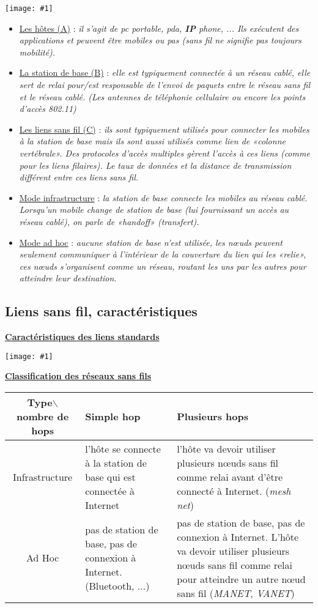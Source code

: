 \documentclass{article}
\newcommand{\ora}[1]{\textcolor{darko}{#1}}
\newcommand{\imgR}[2]{\begin{center}\texttt{[image: \#1]}\end{center}}
\newcommand{\point}[2]{\item \ora{\underline{#1}} : \textit{#2}}
\newcommand{\stitre}[1]{\noindent\textbf{\underline{#1}} \\}
\newcommand{\neuSP}{n\oe ud }
\newcommand{\neuSPs}{n\oe uds }
\begin{document}
\imgR{CN_142.png}{300}
\begin{itemize}
\point{Les hôtes (A)}{il s'agit de pc portable, pda, \textbf{IP} phone, ... Ils exécutent des applications et 
peuvent être mobiles ou pas (sans fil ne signifie pas toujours mobilité).}
\point{La station de base (B)}{elle est typiquement connectée à un réseau cablé, elle sert de relai pour/est 
responsable de l'envoi de paquets entre le réseau sans fil et le réseau cablé. (Les antennes de téléphonie 
cellulaire ou encore les points d'accès 802.11)}
\point{Les liens sans fil (C)}{ils sont typiquement utilisés pour connecter les mobiles à la station de base mais 
ils sont aussi utilisés comme lien de «colonne vertébrale». Des protocoles d'accès multiples gèrent l'accès à ces 
liens (comme pour les liens filaires). Le taux de données et la distance de transmission différent entre ces 
liens sans fil.}
\point{Mode infrastructure}{la station de base connecte les mobiles au réseau cablé. Lorsqu'un mobile change
de station de base (lui fournissant un accès au réseau cablé), on parle de «handoff» (transfert).}
\point{Mode ad hoc}{aucune station de base n'est utilisée, les \neuSPs peuvent seulement communiquer à l'intérieur 
de la couverture du lien qui les «relie», ces \neuSPs s'organisent comme un réseau, routant les uns par les autres 
pour atteindre leur destination.}
\end{itemize}

\subsection{Liens sans fil, caractéristiques}

\stitre{Caractéristiques des liens standards}

\imgR{CN_143.png}{300}
\newpage
\stitre{Classification des réseaux sans fils}

\begin{center}
	\begin{tabular}{|c|p{140px}|p{140px}|}
	\hline
	Type$\backslash$nombre de hops & Simple hop & Plusieurs hops \\
	\hline
	Infrastructure & l'hôte se connecte à la station de base qui est connectée à Internet & l'hôte va devoir 
	utiliser plusieurs \neuSPs sans fil comme relai avant d'être connecté à Internet. (\textit{mesh net}) \\
	\hline
	Ad Hoc & pas de station de base, pas de connexion à Internet.$\ \ \ \ \ \ \ \ \ \ \ $ (Bluetooth, ...) & pas 
	de station de base, pas de connexion à Internet. L'hôte va devoir utiliser plusieurs \neuSPs sans fil comme 
	relai pour atteindre un autre \neuSP sans fil (\textit{MANET}, \textit{VANET})\\
	\hline
	\end{tabular}
\end{center}
\end{document}
